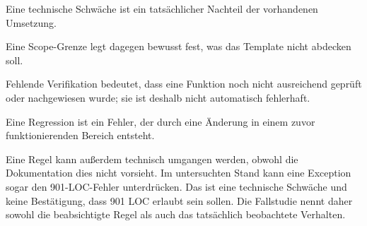 \begin{beginnerstatement}

Eine technische Schwäche ist ein tatsächlicher Nachteil der vorhandenen
Umsetzung.

Eine Scope-Grenze legt dagegen bewusst fest, was das Template nicht abdecken
soll.

Fehlende Verifikation bedeutet, dass eine Funktion noch nicht ausreichend
geprüft oder nachgewiesen wurde; sie ist deshalb nicht automatisch fehlerhaft.

Eine Regression ist ein Fehler, der durch eine Änderung in einem zuvor
funktionierenden Bereich entsteht.

Eine Regel kann außerdem technisch umgangen werden, obwohl die Dokumentation
dies nicht vorsieht. Im untersuchten Stand kann eine Exception sogar den
901-LOC-Fehler unterdrücken. Das ist eine technische Schwäche und keine
Bestätigung, dass 901 LOC erlaubt sein sollen. Die Fallstudie nennt daher
sowohl die beabsichtigte Regel als auch das tatsächlich beobachtete Verhalten.

\end{beginnerstatement}
